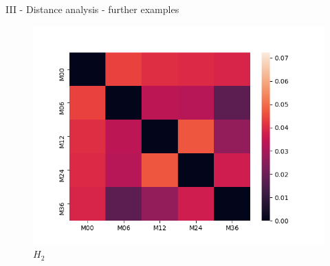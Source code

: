 \documentclass[aspectratio=169, 10pt, dvipsnames]{beamer}
\begin{document}
\begin{frame}[fragile]{III - Distance analysis - further examples}
  \endminipage
  \hfill
  \begin{figure}
    \centering
     \includegraphics[width=\textwidth]{figures/temporal_evolution/ADNI011S0023_h_2.png}
    \caption{$H_2$}
  \end{figure}
  \endminipage
\end{frame}
\end{document}
